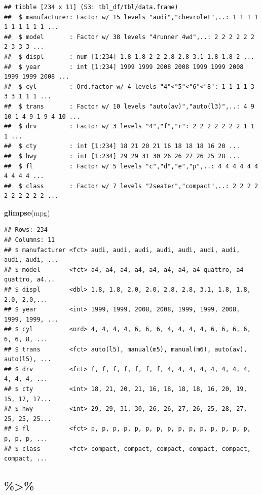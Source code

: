 \documentclass[]{tufte-book}
\newenvironment{Shaded}{}{}
\newcommand{\KeywordTok}[1]{\textcolor[rgb]{0.00,0.44,0.13}{\textbf{#1}}}
\newcommand{\NormalTok}[1]{#1}
\begin{document}
\begin{verbatim}
## tibble [234 x 11] (S3: tbl_df/tbl/data.frame)
##  $ manufacturer: Factor w/ 15 levels "audi","chevrolet",..: 1 1 1 1 1 1 1 1 1 1 ...
##  $ model       : Factor w/ 38 levels "4runner 4wd",..: 2 2 2 2 2 2 2 3 3 3 ...
##  $ displ       : num [1:234] 1.8 1.8 2 2 2.8 2.8 3.1 1.8 1.8 2 ...
##  $ year        : int [1:234] 1999 1999 2008 2008 1999 1999 2008 1999 1999 2008 ...
##  $ cyl         : Ord.factor w/ 4 levels "4"<"5"<"6"<"8": 1 1 1 1 3 3 3 1 1 1 ...
##  $ trans       : Factor w/ 10 levels "auto(av)","auto(l3)",..: 4 9 10 1 4 9 1 9 4 10 ...
##  $ drv         : Factor w/ 3 levels "4","f","r": 2 2 2 2 2 2 2 1 1 1 ...
##  $ cty         : int [1:234] 18 21 20 21 16 18 18 18 16 20 ...
##  $ hwy         : int [1:234] 29 29 31 30 26 26 27 26 25 28 ...
##  $ fl          : Factor w/ 5 levels "c","d","e","p",..: 4 4 4 4 4 4 4 4 4 4 ...
##  $ class       : Factor w/ 7 levels "2seater","compact",..: 2 2 2 2 2 2 2 2 2 2 ...
\end{verbatim}

\begin{Shaded}
\begin{Highlighting}[]
\KeywordTok{glimpse}\NormalTok{(mpg)}
\end{Highlighting}
\end{Shaded}

\begin{verbatim}
## Rows: 234
## Columns: 11
## $ manufacturer <fct> audi, audi, audi, audi, audi, audi, audi, audi, audi, ...
## $ model        <fct> a4, a4, a4, a4, a4, a4, a4, a4 quattro, a4 quattro, a4...
## $ displ        <dbl> 1.8, 1.8, 2.0, 2.0, 2.8, 2.8, 3.1, 1.8, 1.8, 2.0, 2.0,...
## $ year         <int> 1999, 1999, 2008, 2008, 1999, 1999, 2008, 1999, 1999, ...
## $ cyl          <ord> 4, 4, 4, 4, 6, 6, 6, 4, 4, 4, 4, 6, 6, 6, 6, 6, 6, 8, ...
## $ trans        <fct> auto(l5), manual(m5), manual(m6), auto(av), auto(l5), ...
## $ drv          <fct> f, f, f, f, f, f, f, 4, 4, 4, 4, 4, 4, 4, 4, 4, 4, 4, ...
## $ cty          <int> 18, 21, 20, 21, 16, 18, 18, 18, 16, 20, 19, 15, 17, 17...
## $ hwy          <int> 29, 29, 31, 30, 26, 26, 27, 26, 25, 28, 27, 25, 25, 25...
## $ fl           <fct> p, p, p, p, p, p, p, p, p, p, p, p, p, p, p, p, p, p, ...
## $ class        <fct> compact, compact, compact, compact, compact, compact, ...
\end{verbatim}

\hypertarget{section}{%
\subsection{\%\textgreater\%}\label{section}}
\end{document}

